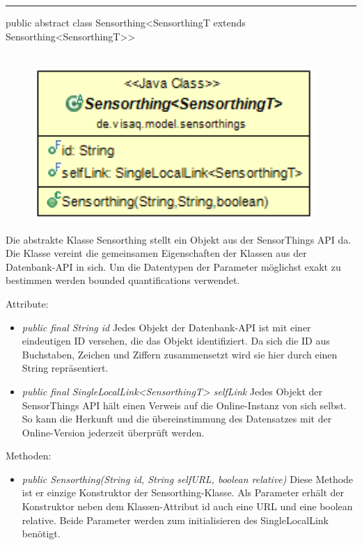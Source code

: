 \rule{\textwidth}{0.4pt}
public abstract class Sensorthing<SensorthingT extends Sensorthing<SensorthingT>>
\\\\
\begin{minipage}{0.4\textwidth}
    \begin{figure}[H]
        {\centering\includegraphics[width=0.95\textwidth]{media/backend/modell/classes/Sensorthing.png}}
    \end{figure}
    \end{minipage} \hfill
    \begin{minipage}{0.6\textwidth}
Die abstrakte Klasse Sensorthing stellt ein Objekt aus der \gls{SensorThings API} da.
Die Klasse vereint die gemeinsamen Eigenschaften der Klassen aus der Datenbank-\gls{API} in sich.
Um die Datentypen der Parameter möglichst exakt zu bestimmen werden \glspl{bounded quantification} verwendet.
\end{minipage}

Attribute:
\begin{itemize}
    \item \emph{public final String id} Jedes Objekt der Datenbank-\gls{API} ist mit einer eindeutigen ID versehen, die das Objekt identifiziert.
    Da sich die ID aus Buchstaben, Zeichen und Ziffern zusammensetzt wird sie hier durch einen String repräsentiert.
    \item \emph{public final SingleLocalLink<SensorthingT> selfLink} Jedes Objekt der \gls{SensorThings API} hält einen Verweis auf die Online-Instanz von sich selbst.
    So kann die Herkunft und die übereinstimmung des Datensatzes mit der Online-Version jederzeit überprüft werden.
\end{itemize}
Methoden: \begin{itemize}
    \item \emph{public Sensorthing(String id, String selfURL, boolean relative)} Diese Methode ist er einzige Konstruktor der Sensorthing-Klasse.
    Als Parameter erhält der Konstruktor neben dem Klassen-Attribut id auch eine URL und eine boolean relative. Beide Parameter werden zum initialisieren des SingleLocalLink benötigt.
\end{itemize}

